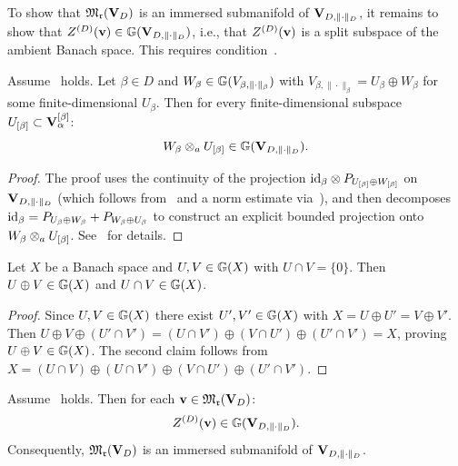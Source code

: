 To show that $\mathfrak{M}_{\mathfrak{r}}(\mathbf{V}_D)$ is an immersed submanifold of
$\mathbf{V}_{D,\|\cdot\|_D}$, it remains to show that $Z^{(D)}(\mathbf{v}) \in \mathbb{G}(\mathbf{V}_{D,\|\cdot\|_D})$,
i.e., that $Z^{(D)}(\mathbf{v})$ is a split subspace of the ambient Banach space.
This requires condition~\condINJ.

\begin{lemma}
\label{lem:two_faces}
Assume \condINJ\ holds. Let $\beta \in D$ and $W_\beta \in
\mathbb{G}(V_{\beta,\|\cdot\|_\beta})$ with $V_{\beta,\|\cdot\|_\beta}
= U_\beta \oplus W_\beta$ for some finite-dimensional $U_\beta$.
Then for every finite-dimensional subspace $U_{[\beta]} \subset
\mathbf{V}_\alpha^{[\beta]}$:
\begin{equation*}
    W_\beta \otimes_a U_{[\beta]} \in \mathbb{G}(\mathbf{V}_{D,\|\cdot\|_D}).
\end{equation*}
\end{lemma}

\begin{proof}
The proof uses the continuity of the projection
$\mathrm{id}_{\beta} \otimes P_{U_{[\beta]} \oplus W_{[\beta]}}$
on $\mathbf{V}_{D,\|\cdot\|_D}$ (which follows from \condINJ\ and a norm estimate
via~\cite[Lemma~3.18]{FH2012}), and then decomposes
$\mathrm{id}_{\beta} = P_{U_\beta \oplus W_\beta} + P_{W_\beta \oplus U_\beta}$
to construct an explicit bounded projection onto
$W_\beta \otimes_a U_{[\beta]}$. See~\cite{FHN2019} for details.
\end{proof}

\begin{lemma}
\label{lem:direct_sum_G}
Let $X$ be a Banach space and $U, V \in \mathbb{G}(X)$ with
$U \cap V = \{0\}$. Then $U \oplus V \in \mathbb{G}(X)$ and
$U \cap V \in \mathbb{G}(X)$.
\end{lemma}

\begin{proof}
Since $U, V \in \mathbb{G}(X)$ there exist $U', V' \in \mathbb{G}(X)$ with
$X = U \oplus U' = V \oplus V'$. Then
$U \oplus V \oplus (U' \cap V') = (U \cap V') \oplus (V \cap U')
\oplus (U' \cap V') = X$, proving $U \oplus V \in \mathbb{G}(X)$.
The second claim follows from $X = (U \cap V) \oplus (U \cap V')
\oplus (V \cap U') \oplus (U' \cap V')$.
\end{proof}

\begin{theorem}
\label{thm:tucker_immersion}
Assume \condINJ\ holds. Then for each $\mathbf{v} \in \mathfrak{M}_{\mathfrak{r}}(\mathbf{V}_D)$:
\begin{equation}
\label{eq:ZD_split}
    Z^{(D)}(\mathbf{v}) \in \mathbb{G}(\mathbf{V}_{D,\|\cdot\|_D}).
\end{equation}
Consequently, $\mathfrak{M}_{\mathfrak{r}}(\mathbf{V}_D)$ is an immersed submanifold of
$\mathbf{V}_{D,\|\cdot\|_D}$.
\end{theorem}

